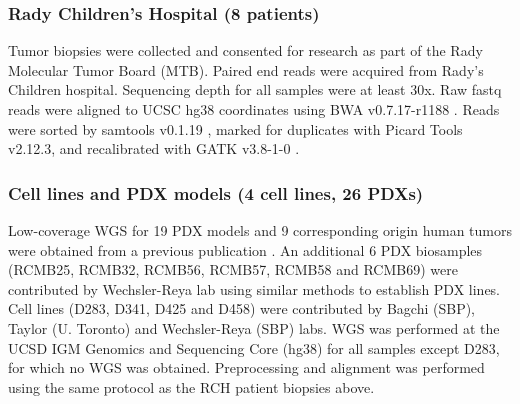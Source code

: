 \subsubsection{Rady Children's Hospital (8 patients)} Tumor biopsies were collected and consented for research as part of the Rady Molecular Tumor Board (MTB). Paired end reads were acquired from Rady's Children hospital. Sequencing depth for all samples were at least 30x. Raw fastq reads were aligned to UCSC hg38 coordinates using BWA v0.7.17-r1188 \cite{bwa}.  Reads were sorted by samtools v0.1.19 \cite{samtools}, marked for duplicates with Picard Tools v2.12.3, and recalibrated with GATK v3.8-1-0 \cite{mckenna_2010,depristo_2011,vanderauwera_2013}.

\subsubsection{Cell lines and PDX models (4 cell lines, 26 PDXs)} Low-coverage WGS for 19 PDX models and 9 corresponding origin human tumors were obtained from a previous publication \cite{rusert_2020}. An additional 6 PDX biosamples (RCMB25, RCMB32, RCMB56, RCMB57, RCMB58 and RCMB69) were contributed by Wechsler-Reya lab using similar methods to establish PDX lines. Cell lines (D283, D341, D425 and D458) were contributed by Bagchi (SBP), Taylor (U. Toronto) and Wechsler-Reya (SBP) labs. WGS was performed at the UCSD IGM Genomics and Sequencing Core (hg38) for all samples except D283, for which no WGS was obtained. Preprocessing and alignment was performed using the same protocol as the RCH patient biopsies above.

